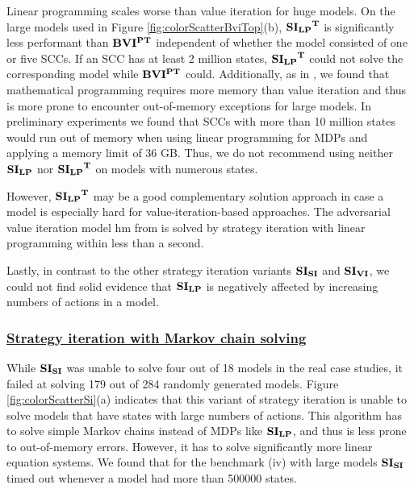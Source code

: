 Linear programming scales worse than value iteration for huge models.
On the large models used in Figure \ref{fig:colorScatterBviTop}(b), $\mathbf{\mathbf{SI_{LP}}^T}$ is significantly less performant than $\mathbf{BVI^{PT}}$ independent of whether the model consisted of one or five SCCs.
If an SCC has at least 2 million states, $\mathbf{\mathbf{SI_{LP}}^T}$ could not solve the corresponding model while $\mathbf{BVI^{PT}}$ could.
Additionally, as in \cite{gandalf}, we found that mathematical programming requires more memory than value iteration and thus is more prone to encounter 
out-of-memory exceptions for large models. 
In preliminary experiments we found that SCCs with more than 10 million states would run out of memory when using linear programming for MDPs and applying a memory limit of 36 GB.
Thus, we do not recommend using neither $\mathbf{SI_{LP}}$ nor $\mathbf{\mathbf{SI_{LP}}^T}$ on models with numerous states. 

However, $\mathbf{\mathbf{SI_{LP}}^T}$ may be a good complementary solution approach in case a model is especially hard for value-iteration-based approaches.
The adversarial value iteration model hm from \cite{haddadmonmege} is solved by strategy iteration with linear programming within less than a second.

Lastly, in contrast to the other strategy iteration variants $\mathbf{SI_{SI}}$ and $\mathbf{SI_{VI}}$, 
we could not find solid evidence that $\mathbf{SI_{LP}}$ is negatively affected by increasing numbers of actions in a model.


\subsubsection*{\underline{Strategy iteration with Markov chain solving}}
While $\mathbf{SI_{SI}}$ was unable to solve four out of 18 models in the real case studies, it failed at solving 179 out of 284 randomly generated models.
Figure \ref{fig:colorScatterSi}(a) indicates that this variant of strategy iteration is unable to solve models that have states with large numbers of actions.
This algorithm has to solve simple Markov chains instead of MDPs like $\mathbf{SI_{LP}}$, and thus is less prone to out-of-memory errors. 
However, it has to solve significantly more linear equation systems.
We found that for the benchmark (iv) with large models $\mathbf{SI_{SI}}$ timed out whenever a model had more than 500000 states.

